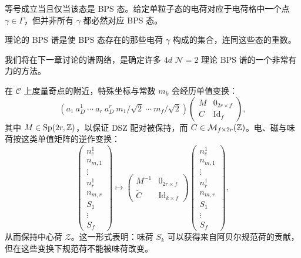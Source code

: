 等号成立当且仅当该态是 BPS 态。给定单粒子态的电荷对应于电荷格中一个点 $\gamma\in\Gamma$，但并非所有 $\gamma$ 都必然对应 BPS 态。

\begin{definition}[20.28]
理论的 BPS 谱是使 BPS 态存在的那些电荷 $\gamma$ 构成的集合，连同这些态的重数。
\end{definition}

我们将在下一章讨论的谱网络，是确定许多 $4d$ $\mathcal{N}=2$ 理论 BPS 谱的一个非常有力的方法。

在 $\mathcal{C}$ 上度量奇点的附近，特殊坐标与常数 $m_k$ 会经历单值变换：
\begin{equation}
(a_1\ a_D^1\ \cdots\ a_r\ a_D^r\ m_1/\sqrt{2}\ \cdots\ m_f/\sqrt{2})
\begin{pmatrix} M & 0_{2r\times f}\\ C & \mathrm{Id}_f\end{pmatrix},\tag{20.18}
\end{equation}
其中 $M\in\operatorname{Sp}(2r,\mathbb{Z})$，以保证 DSZ 配对被保持，而 $C\in\mathcal{M}_{f\times 2r}(\mathbb{Z})$。电、磁与味荷按这类单值矩阵的逆作变换：
\[
\begin{pmatrix}
n_e^1\\ n_{m,1}\\ \vdots\\ n_r^1\\ n_{m,r}\\ S_1\\ \vdots\\ S_f
\end{pmatrix}
\mapsto
\begin{pmatrix} M^{-1} & 0_{2r\times f}\\ \widetilde{C} & \mathrm{Id}_{k\times f}\end{pmatrix}
\begin{pmatrix}
n_e^1\\ n_{m,1}\\ \vdots\\ n_r^1\\ n_{m,r}\\ S_1\\ \vdots\\ S_f
\end{pmatrix},
\]
从而保持中心荷 $\mathcal{Z}$。这一形式表明：味荷 $S_k$ 可以获得来自阿贝尔规范荷的贡献，但在这些变换下规范荷不能被味荷改变。

